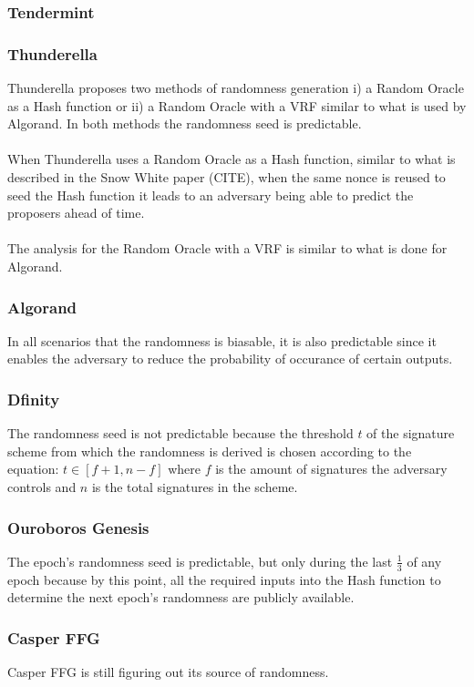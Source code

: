 \documentclass[10pt,journal,compsoc]{IEEEtran}
\begin{document}
\subsubsection{Tendermint}

\subsubsection{Thunderella}
Thunderella proposes two methods of randomness generation i) a Random Oracle as a Hash function or ii) a Random Oracle with a VRF similar to what is used by Algorand. In both methods the randomness seed is predictable. 
\\\\
When Thunderella uses a Random Oracle as a Hash function, similar to what is described in the Snow White paper (CITE), when the same nonce is reused to seed the Hash function it leads to an adversary being able to predict the proposers ahead of time. 
\\\\
The analysis for the Random Oracle with a VRF is similar to what is done for Algorand.
\subsubsection{Algorand}
In all scenarios that the randomness is biasable, it is also predictable since it enables the adversary to reduce the probability of occurance of certain outputs. 
\subsubsection{Dfinity}
The randomness seed is not predictable because the threshold $t$ of the signature scheme from which the randomness is derived is chosen according to the equation: 
$t \in [f+1, n-f]$ where $f$ is the amount of signatures the adversary controls and $n$ is the total signatures in the scheme.
\subsubsection{Ouroboros Genesis}
The epoch's randomness seed is predictable, but only during the last \(\frac{1}{3}\)  of any epoch because by this point, all the required inputs into the Hash function to determine the next epoch's randomness are publicly available. 
\subsubsection{Casper FFG}
Casper FFG is still figuring out its source of randomness.
\end{document}
